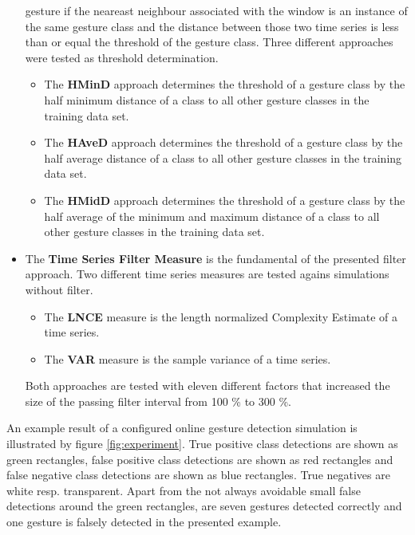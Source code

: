 \begin{itemize}
        gesture if the neareast neighbour associated with the window is an instance of the same gesture class and the
        distance between those two time series is less than or equal the threshold of the gesture class. Three different
        approaches were tested as threshold determination.
        \begin{itemize}
            \item The \textbf{HMinD} approach determines the threshold of a gesture class by the half minimum distance
                of a class to all other gesture classes in the training data set.
            \item The \textbf{HAveD} approach determines the threshold of a gesture class by the half average distance
                of a class to all other gesture classes in the training data set.
            \item The \textbf{HMidD} approach determines the threshold of a gesture class by the half average of the
                minimum and maximum distance of a class to all other gesture classes in the training data set.
        \end{itemize}
    \item The \textbf{Time Series Filter Measure} is the fundamental of the presented filter approach. Two different
        time series measures are tested agains simulations without filter.
        \begin{itemize}
            \item The \textbf{LNCE} measure is the length normalized Complexity Estimate of a time series.
            \item The \textbf{VAR} measure is the sample variance of a time series.
        \end{itemize}
        Both approaches are tested with eleven different factors that increased the size of the passing filter interval
        from 100 \% to 300 \%.
\end{itemize}

An example result of a configured online gesture detection simulation is illustrated by figure \ref{fig:experiment}.
True positive class detections are shown as green rectangles, false positive class detections are shown as red
rectangles and false negative class detections are shown as blue rectangles. True negatives are white resp.
transparent. Apart from the not always avoidable small
false detections around the green rectangles, are seven gestures detected correctly and one gesture is falsely detected
in the presented example.

